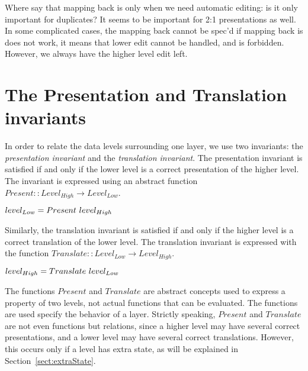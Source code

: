 \bc
Where say that mapping back is only when we need automatic editing: is it only important for duplicates? It seems to be important for 2:1 presentations as well.  In some complicated cases, the mapping back cannot be spec'd if mapping back is does not work, it means that lower edit cannot be handled, and is forbidden. However, we always have the higher level edit left.
\ec

%																
%																
%																
\section{The Presentation and Translation invariants}


In order to relate the data levels surrounding one layer, we use two invariants: the {\em presentation invariant} and the {\em translation invariant}. The presentation invariant is satisfied if and only if the lower level is a correct presentation of the higher level. The invariant is expressed using an abstract function 
$Present ::  Level_{High} \rightarrow Level_{Low}$.

\begin{math}
level_{Low} = Present~level_{High}\\
\end{math}

Similarly, the translation invariant is satisfied if and only if the higher level is a correct translation of the lower level. The translation invariant is expressed with the function 
$Translate ::  Level_{Low} \rightarrow Level_{High}$.

\begin{math}
level_{High} = Translate~level_{Low}\\
\end{math}

The functions $Present$ and $Translate$ are abstract concepts used to express a property of two levels, not actual functions that can be evaluated. The functions are used specify the behavior of a layer.
Strictly speaking, $Present$ and $Translate$ are not even functions but relations, since a higher level may have several correct presentations, and a lower level may have several correct translations. However, this occurs only if a level has extra state, as will be explained in Section~\ref{sect:extraState}.

